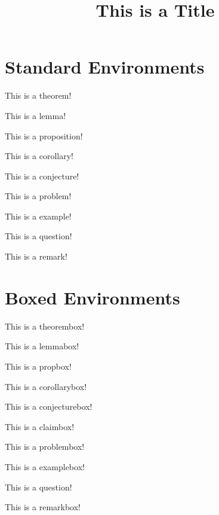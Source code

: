 \documentclass{scrartcl}
\title{This is a Title}
\begin{document}
\maketitle



\section{Standard Environments}
\begin{theorem}
    This is a theorem!
\end{theorem}
\begin{lemma}
    This is a lemma!
\end{lemma}
\begin{proposition}
    This is a proposition!
\end{proposition}
\begin{corollary}
    This is a corollary!
\end{corollary}
\begin{conjecture}
    This is a conjecture!
\end{conjecture}
\begin{problem}
    This is a problem!
\end{problem}
\begin{example}
    This is a example!
\end{example}
\begin{question}
    This is a question!
\end{question}
\begin{remark}
    This is a remark!
\end{remark}

\newpage

\section{Boxed Environments}
\begin{theorembox}
    This is a theorembox!
\end{theorembox}
\begin{lemmabox}
    This is a lemmabox!
\end{lemmabox}
\begin{propbox}
    This is a propbox!
\end{propbox}
\begin{corollarybox}
    This is a corollarybox!
\end{corollarybox}
\begin{conjecturebox}
    This is a conjecturebox!
\end{conjecturebox}
\begin{claimbox}
    This is a claimbox!
\end{claimbox}
\begin{problembox}
    This is a problembox!
\end{problembox}
\begin{examplebox}
    This is a examplebox!
\end{examplebox}
\begin{questionbox}
    This is a question!
\end{questionbox}
\begin{remarkbox}
    This is a remarkbox!
\end{remarkbox}
\end{document}
